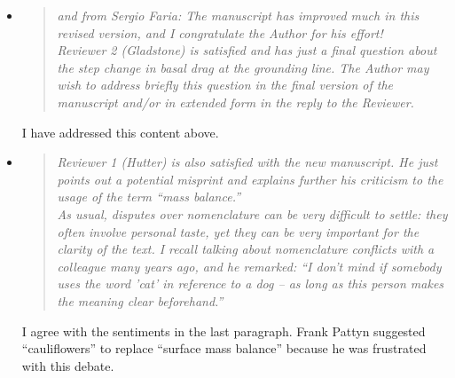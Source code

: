 \documentclass[11pt,reqno]{amsart}
\newcommand{\reply}[2]{
\medskip\medskip
\item  \begin{quote}
\emph{#1}
\end{quote}

\medskip
\noindent #2}
\begin{document}
\begin{itemize}
\reply{and from Sergio Faria: The manuscript has improved much in this revised version, and I congratulate the Author for his effort!
\medskip \\
Reviewer 2 (Gladstone) is satisfied and has just a final question about the step change in basal drag at the grounding line. The Author may wish to address briefly this question in the final version of the manuscript and/or in extended form in the reply to the Reviewer.}
{I have addressed this content above.}

\label{mb}
\reply{Reviewer 1 (Hutter) is also satisfied with the new manuscript. He just points out a potential misprint and explains further his criticism to the usage of the term ``mass balance.''
\medskip \\
As usual, disputes over nomenclature can be very difficult to settle: they often involve personal taste, yet they can be very important for the clarity of the text.  I recall talking about nomenclature conflicts with a colleague many years ago, and he remarked: ``I don't mind if somebody uses the word 'cat' in reference to a dog -- as long as this person makes the meaning clear beforehand.''}
{I agree with the sentiments in the last paragraph.  Frank Pattyn suggested ``cauliflowers'' to replace ``surface mass balance'' because he was frustrated with this debate.}


\end{itemize}
\end{document}
